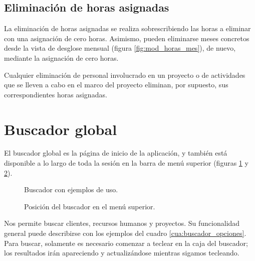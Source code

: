 \subsection{Eliminación de horas asignadas}

La eliminación de horas asignadas se realiza sobrescribiendo las horas a
eliminar con una asignación de cero horas. Asimismo, pueden eliminarse meses
concretos desde la vista de desglose mensual (figura \ref{fig:mod_horas_mes}),
de nuevo, mediante la asignación de cero horas.

Cualquier eliminación de personal involucrado en un proyecto o de actividades
que se lleven a cabo en el marco del proyecto eliminan, por supuesto, sus
correspondientes horas asignadas.

\section{Buscador global}

El buscador global es la página de inicio de la aplicación, y también está
disponible a lo largo de toda la sesión en la barra de menú superior (figuras
\ref{fig:buscador_inicio} y \ref{fig:buscador_superior}).

\begin{figure}
\centering
{}
\caption{Buscador con ejemplos de uso.}
\label{fig:buscador_inicio}
\end{figure}

\begin{figure}
\centering
{}
\caption{Posición del buscador en el menú superior.}
\label{fig:buscador_superior}
\end{figure}

Nos permite buscar clientes, recursos humanos y proyectos. Su funcionalidad
general puede describirse con los ejemplos del cuadro
\ref{cua:buscador_opciones}. Para buscar, solamente es necesario comenzar a
teclear en la caja del buscador; los resultados irán apareciendo y
actualizándose mientras sigamos tecleando.

